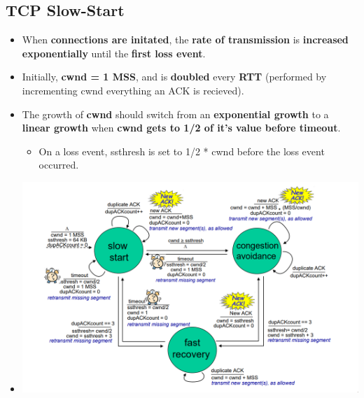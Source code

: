 \documentclass[16pt]{article}
\begin{document}
    \subsection*{TCP Slow-Start}
    \begin{itemize}
        \item When \textbf{connections are initated}, the \textbf{rate of transmission} is \textbf{increased exponentially} until the \textbf{first loss event}.
        \item Initially, \textbf{cwnd = 1 MSS}, and is \textbf{doubled} every \textbf{RTT} (performed by incrementing cwnd everything an ACK is recieved).
        \item The growth of \textbf{cwnd} should switch from an \textbf{exponential growth} to a \textbf{linear growth} when \textbf{cwnd gets  to 1/2 of it's value before timeout}.
        \begin{itemize}
            \item On a loss event, ssthresh is set to 1/2 * cwnd before the loss event occurred.
        \end{itemize}  
        \item[] \begin{center}
                    \includegraphics*[width=\textwidth - 25pt]{images/TCP-Congestion-Control.PNG}
                \end{center}
    \end{itemize}
\end{document}
